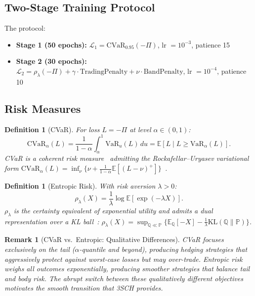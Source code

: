 \documentclass[11pt]{article}
\newtheorem{definition}[theorem]{Definition}
\newtheorem{remark}[theorem]{Remark}
\newcommand{\E}{\mathbb{E}}
\newcommand{\PP}{\mathbb{P}}
\newcommand{\QQ}{\mathbb{Q}}
\newcommand{\cvar}{\mathrm{CVaR}}
\newcommand{\VaR}{\mathrm{VaR}}
\begin{document}
\subsection{Two-Stage Training Protocol}

The \citet{kozyra2019deep} protocol:
\begin{itemize}[noitemsep]
    \item \textbf{Stage 1 (50 epochs):} $\mathcal{L}_1 = \cvar_{0.95}(-\Pi)$, lr $= 10^{-3}$, patience 15
    \item \textbf{Stage 2 (30 epochs):} $\mathcal{L}_2 = \rho_\lambda(-\Pi) + \gamma \cdot \mathrm{TradingPenalty} + \nu \cdot \mathrm{BandPenalty}$, lr $= 10^{-4}$, patience 10
\end{itemize}

\subsection{Risk Measures}

\begin{definition}[CVaR]
\label{def:cvar}
For loss $L=-\Pi$ at level $\alpha\in(0,1)$:
\begin{equation}
    \cvar_\alpha(L) = \frac{1}{1-\alpha}\int_\alpha^1 \VaR_u(L)\,du = \E[L \mid L \geq \VaR_\alpha(L)].
\end{equation}
CVaR is a coherent risk measure~\citep{artzner1999coherent} admitting the Rockafellar--Uryasev variational form $\cvar_\alpha(L) = \inf_\nu\{\nu + \frac{1}{1-\alpha}\E[(L-\nu)^+]\}$~\citep{rockafellar2000optimization}.
\end{definition}

\begin{definition}[Entropic Risk]
\label{def:entropic}
With risk aversion $\lambda > 0$:
\begin{equation}
    \rho_\lambda(X) = \frac{1}{\lambda} \log \E[\exp(-\lambda X)].
\end{equation}
$\rho_\lambda$ is the certainty equivalent of exponential utility and admits a dual representation over a KL ball~\citep{follmer2002convex}:
$\rho_\lambda(X) = \sup_{\QQ \ll \PP}\{\E_\QQ[-X] - \frac{1}{\lambda}\mathrm{KL}(\QQ\|\PP)\}$.
\end{definition}

\begin{remark}[CVaR vs.\ Entropic: Qualitative Differences]
CVaR focuses exclusively on the tail ($\alpha$-quantile and beyond), producing hedging strategies that aggressively protect against worst-case losses but may over-trade. Entropic risk weighs all outcomes exponentially, producing smoother strategies that balance tail and body risk. The abrupt switch between these qualitatively different objectives motivates the smooth transition that 3SCH provides.
\end{remark}
\end{document}
